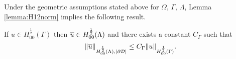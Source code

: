 

Under the geometric assumptions stated above for $\Omega,\,\Gamma,\,\Lambda$, Lemma \ref{lemma:H12norm} implies the following result.
\begin{corollary}\label{corollary:H12norm}
If $u\in H^{\frac 12}_{00}(\Gamma)$ then $\overline{u}\in H^{\frac 12}_{00}(\Lambda)$ and there exists a constant $C_\Gamma$ such that
\begin{equation*}
\|\overline{u}\|_{H^{\frac 12}_{00}(\Lambda), |\partial\mathcal{D}|} \leq C_\Gamma \|u\|_{H^{\frac 12}_{00}(\Gamma)}.
\end{equation*}
\end{corollary}
